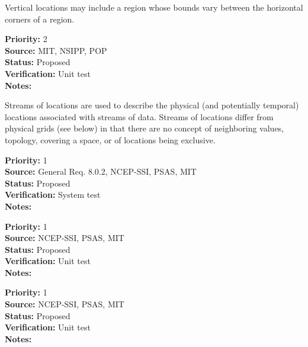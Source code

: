 
  Vertical locations may include a region whose bounds vary between the
horizontal corners of a region.
\begin{reqlist}
{\bf Priority:} 2 \\
{\bf Source:} MIT, NSIPP, POP \\
{\bf Status:} Proposed \\
{\bf Verification:} Unit test\\
{\bf Notes:} 
\end{reqlist}


Streams of locations are used to describe the physical (and potentially temporal)
locations associated with streams of data.  Streams of locations differ from
physical grids (see below) in that there are no concept of neighboring values,
topology, covering a space, or of locations being exclusive.
\begin{reqlist}
{\bf Priority:} 1 \\
{\bf Source:} General Req. 8.0.2, NCEP-SSI,
              PSAS, MIT \\
{\bf Status:} Proposed \\
{\bf Verification:} System test\\
{\bf Notes:} 
\end{reqlist}

\begin{reqlist}
{\bf Priority:} 1 \\
{\bf Source:} NCEP-SSI, PSAS, MIT \\
{\bf Status:} Proposed \\
{\bf Verification:} Unit test \\
{\bf Notes:} 
\end{reqlist}

\begin{reqlist}
{\bf Priority:} 1 \\
{\bf Source:} NCEP-SSI, PSAS, MIT \\
{\bf Status:} Proposed \\
{\bf Verification:} Unit test \\
{\bf Notes:} 
\end{reqlist}

